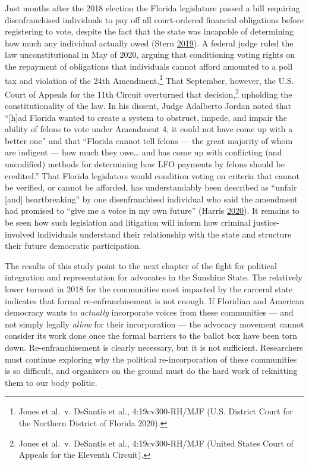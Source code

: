 \documentclass[
  12pt,
]{article}
\begin{document}
Just months after the 2018 election the Florida legislature passed a bill requiring disenfranchised individuals to pay off all court-ordered financial obligations before registering to vote, despite the fact that the state was incapable of determining how much any individual actually owed (Stern \protect\hyperlink{ref-Stern2019}{2019}). A federal judge ruled the law unconstitutional in May of 2020, arguing that conditioning voting rights on the repayment of obligations that individuals cannot afford amounted to a poll tax and violation of the 24th Amendment.\footnote{Jones et al.~v. DeSantis et al., 4:19cv300-RH/MJF (U.S. District Court for the Northern District of Florida 2020).} That September, however, the U.S. Court of Appeals for the 11th Circuit overturned that decision,\footnote{Jones et al.~v. DeSantis et al., 4:19cv300-RH/MJF (United States Court of Appeals for the Eleventh Circuit).} upholding the constitutionality of the law. In his dissent, Judge Adalberto Jordan noted that ``{[}h{]}ad Florida wanted to create a system to obstruct, impede, and impair the ability of felons to vote under Amendment 4, it could not have come up with a better one'' and that ``Florida cannot tell felons --- the great majority of whom are indigent --- how much they owe\ldots{} and has come up with conflicting (and uncodified) methods for determining how LFO payments by felons should be credited.'' That Florida legislators would condition voting on criteria that cannot be verified, or cannot be afforded, has understandably been described as ``unfair {[}and{]} heartbreaking'' by one disenfranchised individual who said the amendment had promised to ``give me a voice in my own future'' (Harris \protect\hyperlink{ref-Harris2020}{2020}). It remains to be seen how such legislation and litigation will inform how criminal justice-involved individuals understand their relationship with the state and structure their future democratic participation.

The results of this study point to the next chapter of the fight for political integration and representation for advocates in the Sunshine State. The relatively lower turnout in 2018 for the communities most impacted by the carceral state indicates that formal re-enfranchisement is not enough. If Floridian and American democracy wants to \emph{actually} incorporate voices from these communities --- and not simply legally \emph{allow} for their incorporation --- the advocacy movement cannot consider its work done once the formal barriers to the ballot box have been torn down. Re-enfranchisement is clearly necessary, but it is not sufficient. Researchers must continue exploring why the political re-incorporation of these communities is so difficult, and organizers on the ground must do the hard work of reknitting them to our body politic.
\end{document}

